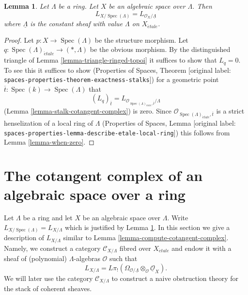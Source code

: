 \documentclass[10pt,a4paper]{article}
\theoremstyle{plain}
\newtheorem{lemma}[subsection]{Lemma}
\theoremstyle{definition}
\theoremstyle{remark}
\numberwithin{equation}{subsection}
\def\Spec{\mathop{\mathrm{Spec}}}
\def\etale{{\acute{e}tale}}
\begin{document}
\begin{lemma}
\label{lemma-space-over-ring}
Let $\Lambda$ be a ring. Let $X$ be an algebraic space over $\Lambda$.
Then
$$
L_{X/\Spec(\Lambda)} = L_{\mathcal{O}_X/\underline{\Lambda}}
$$
where $\underline{\Lambda}$ is the constant sheaf with value
$\Lambda$ on $X_\etale$.
\end{lemma}

\begin{proof}
Let $p : X \to \Spec(\Lambda)$ be the structure morphism.
Let $q : \Spec(\Lambda)_\etale \to (*, \Lambda)$
be the obvious morphism. By the distinguished triangle of
Lemma \ref{lemma-triangle-ringed-topoi}
it suffices to show that $L_q = 0$. To see this it suffices to
show
(Properties of Spaces, Theorem
\textnormal{[original label: \nolinkurl{spaces-properties-theorem-exactness-stalks}]})
for a geometric point $\overline{t} : \Spec(k) \to \Spec(\Lambda)$ that
$$
(L_q)_{\overline{t}} =
L_{\mathcal{O}_{\Spec(\Lambda)_\etale, \overline{t}}/\Lambda}
$$
(Lemma \ref{lemma-stalk-cotangent-complex})
is zero. Since $\mathcal{O}_{\Spec(\Lambda)_\etale, \overline{t}}$
is a strict henselization of a local ring of $\Lambda$
(Properties of Spaces, Lemma
\textnormal{[original label: \nolinkurl{spaces-properties-lemma-describe-etale-local-ring}]})
this follows from Lemma \ref{lemma-when-zero}.
\end{proof}










\section{The cotangent complex of an algebraic space over a ring}
\label{section-cotangent-spaces-variant}

\noindent
Let $\Lambda$ be a ring and let $X$ be an algebraic space over $\Lambda$.
Write $L_{X/\Spec(\Lambda)} = L_{X/\Lambda}$ which is justified
by Lemma \ref{lemma-space-over-ring}.
In this section we give a description of $L_{X/\Lambda}$ similar to
Lemma \ref{lemma-compute-cotangent-complex}.
Namely, we construct a category $\mathcal{C}_{X/\Lambda}$
fibred over $X_\etale$ and endow it with a sheaf of (polynomial)
$\Lambda$-algebras $\mathcal{O}$ such that
$$
L_{X/\Lambda} =
L\pi_!(\Omega_{\mathcal{O}/\underline{\Lambda}} \otimes_\mathcal{O}
\underline{\mathcal{O}}_X).
$$
We will later use the category $\mathcal{C}_{X/\Lambda}$ to construct
a naive obstruction theory for the stack of coherent sheaves.
\end{document}

